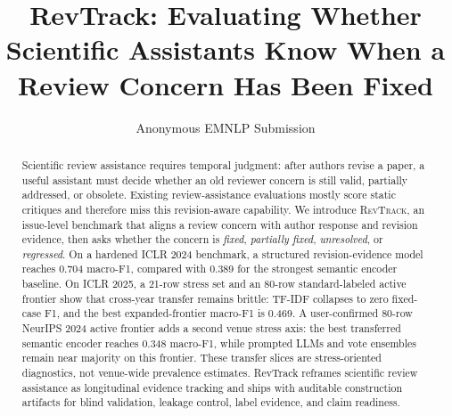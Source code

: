 \documentclass[11pt]{article}
\title{RevTrack: Evaluating Whether Scientific Assistants Know When a Review Concern Has Been Fixed}
\author{Anonymous EMNLP Submission}
\begin{document}
\maketitle

\begin{abstract}
Scientific review assistance requires temporal judgment: after authors revise a paper, a useful assistant must decide whether an old reviewer concern is still valid, partially addressed, or obsolete.
Existing review-assistance evaluations mostly score static critiques and therefore miss this revision-aware capability.
We introduce \textsc{RevTrack}, an issue-level benchmark that aligns a review concern with author response and revision evidence, then asks whether the concern is \textit{fixed}, \textit{partially fixed}, \textit{unresolved}, or \textit{regressed}.
On a hardened ICLR 2024 benchmark, a structured revision-evidence model reaches 0.704 macro-F1, compared with 0.389 for the strongest semantic encoder baseline.
On ICLR 2025, a 21-row stress set and an 80-row standard-labeled active frontier show that cross-year transfer remains brittle: TF-IDF collapses to zero fixed-case F1, and the best expanded-frontier macro-F1 is 0.469.
A user-confirmed 80-row NeurIPS 2024 active frontier adds a second venue stress axis: the best transferred semantic encoder reaches 0.348 macro-F1, while prompted LLMs and vote ensembles remain near majority on this frontier.
These transfer slices are stress-oriented diagnostics, not venue-wide prevalence estimates.
RevTrack reframes scientific review assistance as longitudinal evidence tracking and ships with auditable construction artifacts for blind validation, leakage control, label evidence, and claim readiness.
\end{abstract}













\appendix

\end{document}
